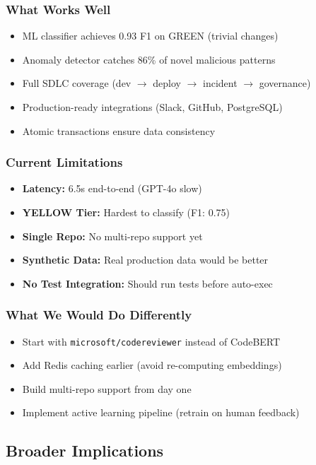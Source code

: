 \documentclass[11pt,a4paper]{article}
\begin{document}
\subsubsection{What Works Well}
\begin{itemize}
    \item ML classifier achieves 0.93 F1 on GREEN (trivial changes)
    \item Anomaly detector catches 86\% of novel malicious patterns
    \item Full SDLC coverage (dev $\rightarrow$ deploy $\rightarrow$ incident $\rightarrow$ governance)
    \item Production-ready integrations (Slack, GitHub, PostgreSQL)
    \item Atomic transactions ensure data consistency
\end{itemize}

\subsubsection{Current Limitations}
\begin{itemize}
    \item \textbf{Latency:} 6.5s end-to-end (GPT-4o slow)
    \item \textbf{YELLOW Tier:} Hardest to classify (F1: 0.75)
    \item \textbf{Single Repo:} No multi-repo support yet
    \item \textbf{Synthetic Data:} Real production data would be better
    \item \textbf{No Test Integration:} Should run tests before auto-exec
\end{itemize}

\subsubsection{What We Would Do Differently}
\begin{itemize}
    \item Start with \texttt{microsoft/codereviewer} instead of CodeBERT
    \item Add Redis caching earlier (avoid re-computing embeddings)
    \item Build multi-repo support from day one
    \item Implement active learning pipeline (retrain on human feedback)
\end{itemize}

\subsection{Broader Implications}
\end{document}
